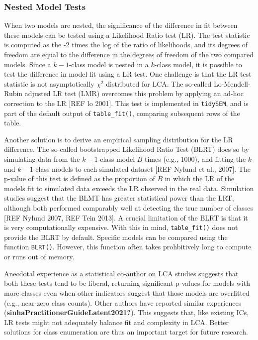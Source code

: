 \documentclass[
  ,man,floatsintext]{apa6}
\begin{document}
\hypertarget{nested-model-tests}{%
\subsubsection{Nested Model Tests}\label{nested-model-tests}}

When two models are nested, the significance of the difference in fit between these models can be tested using a Likelihood Ratio test (LR).
The test statistic is computed as the -2 times the log of the ratio of likelihoods,
and its degrees of freedom are equal to the difference in the degrees of freedom of the two compared models.
Since a \(k-1\)-class model is nested in a \(k\)-class model,
it is possible to test the difference in model fit using a LR test.
One challenge is that the LR test statistic is not asymptotically \(\chi^2\) distributed for LCA.
The so-called Lo-Mendell-Rubin adjusted LR test (LMR) overcomes this problem by applying an ad-hoc correction to the LR {[}REF lo 2001{]}.
This test is implemented in \texttt{tidySEM}, and is part of the default output of \texttt{table\_fit()}, comparing subsequent rows of the table.

Another solution is to derive an empirical sampling distribution for the LR difference.
The so-called bootstrapped Likelihood Ratio Test (BLRT) does so by simulating data from the \(k-1\)-class model \(B\) times (e.g., 1000),
and fitting the \(k\)- and \(k-1\)-class models to each simulated dataset {[}REF Nylund et al., 2007{]}.
The p-value of this test is defined as the proportion of \(B\) in which the LR of the models fit to simulated data exceeds the LR observed in the real data.
Simulation studies suggest that the BLMT has greater statistical power than the LRT,
although both performed comparably well at detecting the true number of classes {[}REF Nylund 2007, REF Tein 2013{]}.
A crucial limitation of the BLRT is that it is very computationally expensive.
With this in mind, \texttt{table\_fit()} does not provide the BLRT by default.
Specific models can be compared using the function \texttt{BLRT()}.
However, this function often takes prohbitively long to compute or runs out of memory.

Anecdotal experience as a statistical co-author on LCA studies suggests that both these tests tend to be liberal,
returning significant p-values for models with more classes even when other indicators suggest that those models are overfitted (e.g., near-zero class counts).
Other authors have reported similar experiences (\textbf{sinhaPractitionerGuideLatent2021?}).
This suggests that, like existing ICs,
LR tests might not adequately balance fit and complexity in LCA.
Better solutions for class enumeration are thus an important target for future research.
\end{document}
